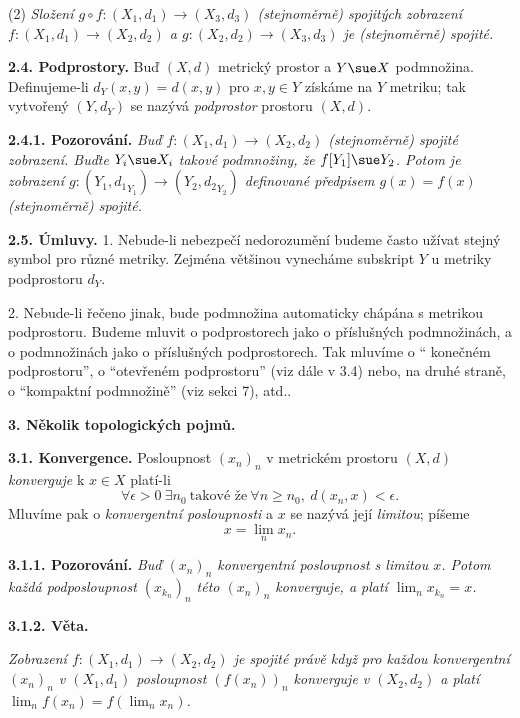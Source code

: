 \documentclass[12pt]{article}
\begin{document}
{ (2) {\em Složení $g\circ f:(X_1,d_1)\to(X_3,d_3)$ (stejnoměrně) spojitých zobrazení
  $f:(X_1,d_1)\to(X_2,d_2)$ a  $g:(X_2,d_2)\to(X_3,d_3)$ je (stejnoměrně) spojité.}
  
 

\bigskip

{\bf 2.4. Podprostory.} Buď $(X,d)$ metrický prostor a $Y\sue X$ podmnožina.
Definujeme-li $d_Y(x,y)=d(x,y)$ pro $x,y\in Y$ získáme na $Y$ metriku; tak vytvořený $(Y,d_Y)$
 se nazývá  {\em podprostor} prostoru $(X,d)$.
  
  \medskip
  
  {\bf 2.4.1. Pozorování.} {\em Buď $f:(X_1,d_1)\to(X_2,d_2)$  (stejnoměrně) spojité zobrazení. Buďte $Y_i\sue X_i$ takové podmnožiny, že $f[Y_1]\sue Y_2$. Potom je zobrazení $g:(Y_1,{d_1}_{Y_1})\to(Y_2,{d_2}_{Y_2})$ definované předpisem $g(x)=f(x)$ (stejnoměrně) spojité.}
  
  \bigskip
  
  {\bf 2.5. Úmluvy.} 1. Nebude-li nebezpečí nedorozumění budeme často užívat stejný symbol pro různé metriky. Zejména většinou vynecháme subskript $Y$ u metriky podprostoru $d_Y$.
  
  2. Nebude-li řečeno jinak, bude podmnožina automaticky chápána s metrikou podprostoru. Budeme mluvit o podprostorech jako o příslušných pod\-mno\-žinách, a o podmnožinách jako o příslušných podprostorech. Tak mluvíme o   `` konečném podprostoru'', o ``otevřeném podprostoru'' (viz dále v 3.4) nebo, na druhé straně, o ``kompaktní podmnožině'' (viz sekci  7), atd.. 
  
 \vskip10mm
 
 {\large\bf 3. Několik topologických pojmů.}
  
 \bigskip
 
 
 {\bf 3.1. Konvergence.} Posloupnost $(x_n)_n$ v metrickém prostoru $(X,d)$ {\em konverguje} k $x\in X$ platí-li
 $$
 \forall\epsilon>0\ \exists n_0\ \text{takové že}\ \forall n\geq n_0,\ d(x_n,x)<\epsilon.
 $$
 Mluvíme pak o {\em konvergentní posloupnosti} a $x$ se nazývá její {\em limitou}; píšeme
 $$
 x=\lim_n x_n.
 $$
 
 \medskip
 
 {\bf 3.1.1. Pozorování.} {\em Buď $(x_n)_n$ konvergentní posloupnost s limitou $x$.  Potom každá podposloupnost $(x_{k_n})_n$ této $(x_n)_n$ konverguje, a platí $\lim_nx_{k_n}=x$.}
 
 \medskip

 {\bf 3.1.2. Věta.} {\em Zobrazení $f:(X_1,d_1)\to (X_2,d_2)$ je spojité právě když pro každou konvergentní  $(x_n)_n$ v $(X_1,d_1)$ posloupnost $(f(x_n))_n$ konverguje v $(X_2,d_2)$ a  platí
 $\lim_nf(x_n)=f(\lim_nx_n)$.
 
}}
\end{document}
